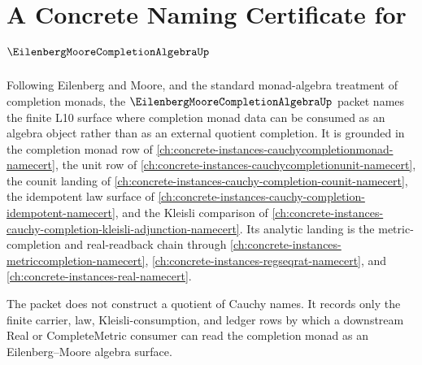 \chapter{A Concrete Naming Certificate for $\EilenbergMooreCompletionAlgebraUp$}
\label{ch:concrete-instances-eilenberg-moore-completion-algebra-namecert}

Following Eilenberg and Moore, and the standard monad-algebra treatment of completion monads, the $\EilenbergMooreCompletionAlgebraUp$ packet names the finite L10 surface where completion monad data can be consumed as an algebra object rather than as an external quotient completion. It is grounded in the completion monad row of \autoref{ch:concrete-instances-cauchycompletionmonad-namecert}, the unit row of \autoref{ch:concrete-instances-cauchycompletionunit-namecert}, the counit landing of \autoref{ch:concrete-instances-cauchy-completion-counit-namecert}, the idempotent law surface of \autoref{ch:concrete-instances-cauchy-completion-idempotent-namecert}, and the Kleisli comparison of \autoref{ch:concrete-instances-cauchy-completion-kleisli-adjunction-namecert}. Its analytic landing is the metric-completion and real-readback chain through \autoref{ch:concrete-instances-metriccompletion-namecert}, \autoref{ch:concrete-instances-regseqrat-namecert}, and \autoref{ch:concrete-instances-real-namecert}.

The packet does not construct a quotient of Cauchy names. It records only the finite carrier, law, Kleisli-consumption, and ledger rows by which a downstream Real or CompleteMetric consumer can read the completion monad as an Eilenberg--Moore algebra surface.


